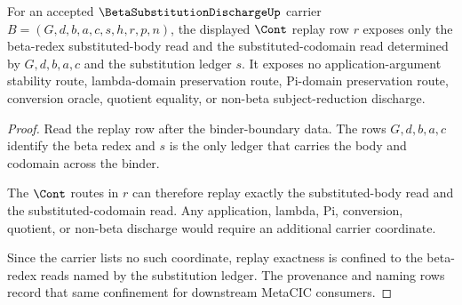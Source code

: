 \begin{theorem}
\label{thm:beta-substitution-discharge-replay-exactness}
For an accepted $\BetaSubstitutionDischargeUp$ carrier $B=(G,d,b,a,c,s,h,r,p,n)$, the displayed $\Cont$ replay row $r$ exposes only the beta-redex substituted-body read and the substituted-codomain read determined by $G,d,b,a,c$ and the substitution ledger $s$. It exposes no application-argument stability route, lambda-domain preservation route, Pi-domain preservation route, conversion oracle, quotient equality, or non-beta subject-reduction discharge.
\end{theorem}
\begin{proof}
Read the replay row after the binder-boundary data. The rows $G,d,b,a,c$ identify the beta redex and $s$ is the only ledger that carries the body and codomain across the binder.

The $\Cont$ routes in $r$ can therefore replay exactly the substituted-body read and the substituted-codomain read. Any application, lambda, Pi, conversion, quotient, or non-beta discharge would require an additional carrier coordinate.

Since the carrier lists no such coordinate, replay exactness is confined to the beta-redex reads named by the substitution ledger. The provenance and naming rows record that same confinement for downstream MetaCIC consumers.
\end{proof}

